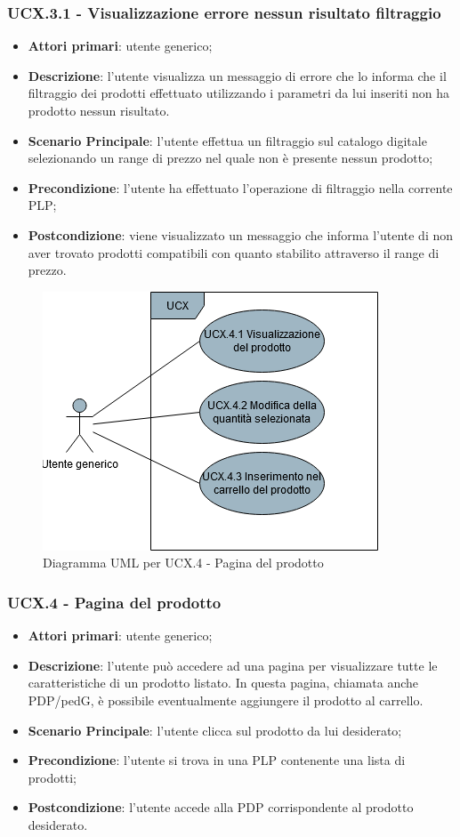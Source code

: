 \subsubsection{UCX.3.1 - Visualizzazione errore nessun risultato filtraggio}
\begin{itemize}
\item \textbf{Attori primari}: utente generico;
\item \textbf{Descrizione}: l'utente visualizza un messaggio di errore che lo informa che il filtraggio dei prodotti effettuato utilizzando i parametri da lui inseriti non ha prodotto nessun risultato.
\item \textbf{Scenario Principale}: l'utente effettua un filtraggio sul catalogo digitale selezionando un range di prezzo nel quale non è presente nessun prodotto;
\item \textbf{Precondizione}: l'utente ha effettuato l'operazione di filtraggio nella corrente PLP;
\item \textbf{Postcondizione}: viene visualizzato un messaggio che informa l'utente di non aver trovato prodotti compatibili con quanto stabilito attraverso il range di prezzo.
\end{itemize}
\begin{figure}[H]
\centering
\includegraphics[scale=0.6]{res/UseCase/Immagini/PaginaDelProdotto}
\caption{Diagramma UML per UCX.4 - Pagina del prodotto}
\end{figure}
\subsubsection{UCX.4 - Pagina del prodotto}
\begin{itemize}
\item \textbf{Attori primari}: utente generico;
\item \textbf{Descrizione}: l'utente può accedere ad una pagina per visualizzare tutte le caratteristiche di un prodotto listato. In questa pagina, chiamata anche PDP/ped{G}, è possibile eventualmente aggiungere il prodotto al carrello.
\item \textbf{Scenario Principale}: l'utente clicca sul prodotto da lui desiderato;
\item \textbf{Precondizione}: l'utente si trova in una PLP contenente una lista di prodotti;
\item \textbf{Postcondizione}: l'utente accede alla PDP corrispondente al prodotto desiderato.
\end{itemize}